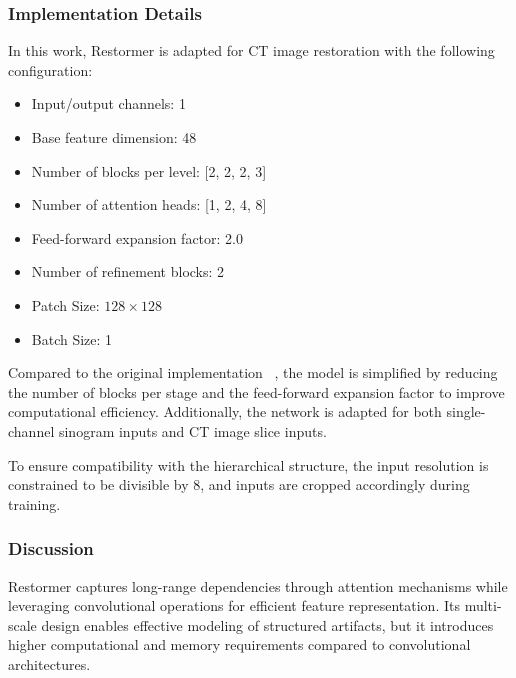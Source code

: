 \subsubsection{Implementation Details}

In this work, Restormer is adapted for CT image restoration with the following configuration:

\begin{itemize}
    \item Input/output channels: 1
    \item Base feature dimension: 48
    \item Number of blocks per level: [2, 2, 2, 3]
    \item Number of attention heads: [1, 2, 4, 8]
    \item Feed-forward expansion factor: 2.0
    \item Number of refinement blocks: 2
    \item Patch Size: $128 \times 128$
    \item Batch Size: 1
\end{itemize}

Compared to the original implementation ~\cite{restormer2022}, the model is simplified by reducing the number of blocks per stage and the feed-forward expansion factor to improve computational efficiency. Additionally, the network is adapted for both single-channel sinogram inputs and CT image slice inputs.

To ensure compatibility with the hierarchical structure, the input resolution is constrained to be divisible by 8, and inputs are cropped accordingly during training.

\subsubsection{Discussion}

Restormer captures long-range dependencies through attention mechanisms while leveraging convolutional operations for efficient feature representation. Its multi-scale design enables effective modeling of structured artifacts, but it introduces higher computational and memory requirements compared to convolutional architectures.